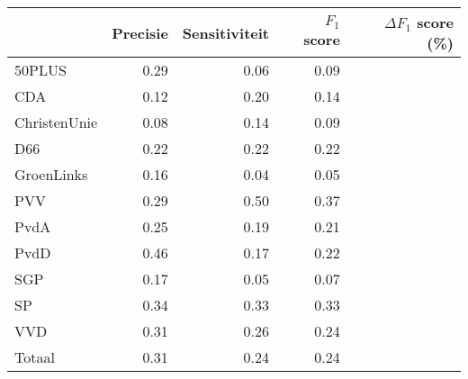 \begin{tabular}{lrrrr}
\toprule
{} &  Precisie &  Sensitiviteit &  $F_1$ score &  $\Delta F_1$ score (\%) \\
\midrule
50PLUS       &       0.29 &    0.06 &      0.09 &           \\
CDA          &       0.12 &    0.20 &      0.14 &          \\
ChristenUnie &       0.08 &    0.14 &      0.09 &           \\
D66          &       0.22 &    0.22 &      0.22 &          \\
GroenLinks   &       0.16 &    0.04 &      0.05 &          \\
PVV          &       0.29 &    0.50 &      0.37 &          \\
PvdA         &       0.25 &    0.19 &      0.21 &          \\
PvdD         &       0.46 &    0.17 &      0.22 &          \\
SGP          &       0.17 &    0.05 &      0.07 &           \\
SP           &       0.34 &    0.33 &      0.33 &          \\
VVD          &       0.31 &    0.26 &      0.24 &          \\
\midrule
Totaal       &       0.31 &    0.24 &      0.24 &         \\
\bottomrule
\end{tabular}
